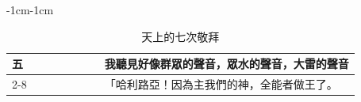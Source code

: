 \begin{changemargin}{-1cm}{-1cm}
\begin{table}
\begin{tabular}{ |p{.3cm}|p{2.5cm}|p{3.5cm}| p{2.5cm}|p{5cm}|p{3.5cm}|p{2cm}|p{4cm}|  }
 \multicolumn{1}{|m{.2cm}|}{五}&
\multicolumn{1}{m{2.5cm}|}{}  &
\multicolumn{1}{m{3.5cm}|}{}  &
 \multicolumn{1}{m{2.5cm}|}{} &
 \multicolumn{1}{m{5cm}|}{}  &
 \multicolumn{1}{m{3.5cm}|}{}   &
 \multicolumn{1}{m{2.5cm}|}{}  &  
\multicolumn{1}{m{4cm}|}{我聽見好像群眾的聲音，眾水的聲音，大雷的聲音} \\\cline{2-8}


&\multicolumn{1}{m{2.5cm}|}{}  &
\multicolumn{1}{m{3.5cm}|}{}  &
 \multicolumn{1}{m{2.5cm}|}{} &
 \multicolumn{1}{m{5cm}|}{}  &
 \multicolumn{1}{m{3.5cm}|}{}   &
 \multicolumn{1}{m{2.5cm}|}{}  &  
\multicolumn{1}{m{4cm}|}{「哈利路亞！因為主我們的神，全能者做王了。} \\\hline
\end{tabular}
\caption{天上的七次敬拜}
\end{table} 
\end{changemargin}






